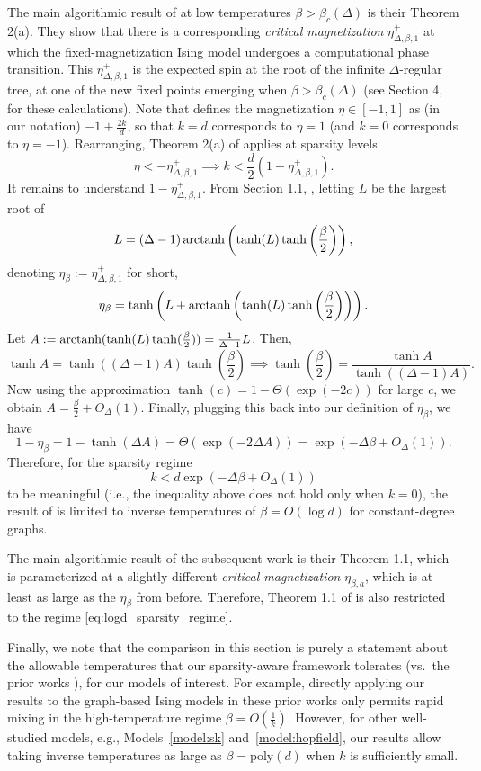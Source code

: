 \documentclass[11pt]{article}
\newcommand{\defeq}{:=}
\newcommand{\1}{\mathbf{1}}
\newcommand{\0}{\mathbf{0}}
\newcommand{\Par}[1]{\left(#1\right)}
\newcommand{\poly}{\mathrm{poly}}
\begin{document}
The main algorithmic result of \cite{Carlson2022} at low temperatures $\beta > \beta_c(\Delta)$ is their Theorem 2(a). They show that there is a corresponding \emph{critical magnetization} $\eta_{\Delta, \beta, 1}^+$ at which the fixed-magnetization Ising model undergoes a computational phase transition. This $\eta_{\Delta, \beta, 1}^+$ is the expected spin at the root of the infinite $\Delta$-regular tree, at one of the new fixed points emerging when $\beta > \beta_c(\Delta)$ (see Section 4, \cite{Carlson2022} for these calculations).
Note that \cite{Carlson2022} defines the magnetization $\eta \in [-1, 1]$ as (in our notation) $-1 + \frac{2k}{d}$, so that $k = d$ corresponds to $\eta = 1$ (and $k = 0$ corresponds to $\eta = -1$). Rearranging, Theorem 2(a) of \cite{Carlson2022} applies at sparsity levels
\[\eta < -\eta_{\Delta, \beta, 1}^+ \implies k < \frac d 2 \Par{1 - \eta_{\Delta, \beta, 1}^+}. \]
It remains to understand $1 - \eta_{\Delta, \beta, 1}^+$. From Section 1.1, \cite{Carlson2022}, letting $L$ be the largest root of
\[L = \Par{\Delta - 1}\textup{arctanh} \Par{\tanh(L)\tanh\Par{\frac \beta 2 }},\]
denoting $\eta_\beta \defeq \eta_{\Delta, \beta, 1}^+$ for short,
\[\eta_\beta = \tanh\Par{L + \textup{arctanh}\Par{\tanh(L)\tanh\Par{\frac \beta 2 }}}.\]
Let $A \defeq \textup{arctanh} (\tanh(L)\tanh(\frac \beta 2)) = \frac 1 {\Delta - 1} L$. Then,
\[\tanh A = \tanh\Par{(\Delta - 1)A} \tanh\Par{\frac \beta 2} \implies \tanh\Par{\frac \beta 2} = \frac{\tanh A}{\tanh\Par{(\Delta - 1)A}}.\]
Now using the approximation $\tanh(c) = 1 - \Theta(\exp(-2c))$ for large $c$, we obtain
$A = \frac \beta 2 + O_\Delta(1)$.
Finally, plugging this back into our definition of $\eta_\beta$, we have
\[1 - \eta_\beta = 1 - \tanh\Par{\Delta A} = \Theta\Par{\exp\Par{-2\Delta A}} = \exp\Par{-\Delta\beta + O_\Delta(1)}.\]
Therefore, for the sparsity regime
\begin{equation}\label{eq:logd_sparsity_regime}k < d\exp\Par{-\Delta\beta + O_\Delta(1)}\end{equation}
to be meaningful (i.e., the inequality above does not hold only when $k = 0$), the result of \cite{Carlson2022} is limited to inverse temperatures of $\beta = O(\log d)$ for constant-degree graphs. 

The main algorithmic result of the subsequent work \cite{KuchukovaPappikPerkinsYap2025} is their Theorem 1.1, which is parameterized at a slightly different \emph{critical magnetization} $\eta_{\beta, a}$, which is at least as large as the $\eta_\beta$ from before. Therefore, Theorem 1.1 of \cite{KuchukovaPappikPerkinsYap2025} is also restricted to the regime \eqref{eq:logd_sparsity_regime}. 

Finally, we note that the comparison in this section is purely a statement about the allowable temperatures that our sparsity-aware framework tolerates (vs.\ the prior works \cite{Carlson2022, KuchukovaPappikPerkinsYap2025}), for our models of interest. For example, directly applying our results to the graph-based Ising models in these prior works only permits rapid mixing in the high-temperature regime $\beta = O(\frac 1 k)$. However, for other well-studied models, e.g., Models~\ref{model:sk} and~\ref{model:hopfield}, our results allow taking inverse temperatures as large as $\beta = \poly(d)$ when $k$ is sufficiently small.
\end{document}

